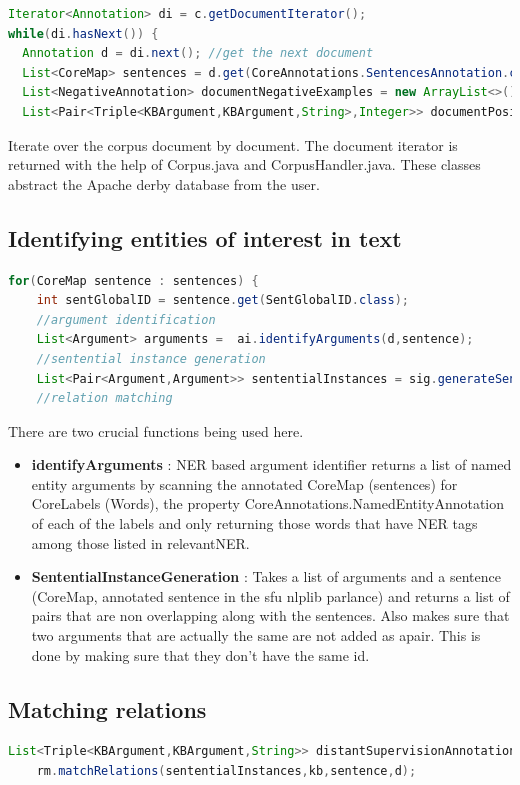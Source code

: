 \documentclass[a4paper,10pt]{report}
\begin{document}
\begin{lstlisting}[language=java]
Iterator<Annotation> di = c.getDocumentIterator();
while(di.hasNext()) {
  Annotation d = di.next(); //get the next document
  List<CoreMap> sentences = d.get(CoreAnnotations.SentencesAnnotation.class); //get the sentences in the document
  List<NegativeAnnotation> documentNegativeExamples = new ArrayList<>(); //create space for negative annon in this doc
  List<Pair<Triple<KBArgument,KBArgument,String>,Integer>> documentPositiveExamples = new ArrayList<>(); 
\end{lstlisting}
Iterate over the corpus document by document. The document iterator is returned with the help of Corpus.java and CorpusHandler.java. These classes abstract the Apache derby database
from the user. 
\subsection{Identifying entities of interest in text}
\begin{lstlisting}[language=java]
for(CoreMap sentence : sentences) {
	int sentGlobalID = sentence.get(SentGlobalID.class);			
	//argument identification
	List<Argument> arguments =  ai.identifyArguments(d,sentence);
	//sentential instance generation
	List<Pair<Argument,Argument>> sententialInstances = sig.generateSententialInstances(arguments, sentence);
	//relation matching
\end{lstlisting}
There are two crucial functions being used here.
\begin{itemize}
 \item	\textbf{identifyArguments} : NER based argument identifier returns a list of named entity arguments by scanning the annotated CoreMap (sentences) for CoreLabels (Words),  the property CoreAnnotations.NamedEntityAnnotation of each of the labels and only returning those words that have NER tags among those listed in relevantNER.
  \item \textbf{SententialInstanceGeneration} : Takes a list of arguments and a sentence (CoreMap, annotated sentence in the sfu nlplib parlance) and returns a list of pairs that are non overlapping along with the sentences. Also makes sure that two arguments that are actually the same are not added as apair.
  This is done by making sure that they don't have the same id.
\end{itemize}


\subsection{Matching relations}
\begin{lstlisting}[language=java]
List<Triple<KBArgument,KBArgument,String>> distantSupervisionAnnotations = 
	rm.matchRelations(sententialInstances,kb,sentence,d);
\end{lstlisting}
\end{document}
